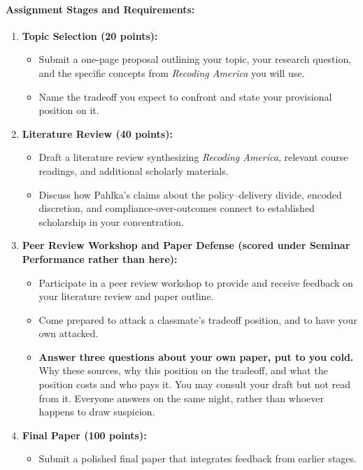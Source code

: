 \documentclass[11pt]{article}     %
\begin{document}
\paragraph*{Assignment Stages and Requirements:}
\begin{enumerate}
    \item \textbf{Topic Selection (20 points):}
    \begin{itemize}
        \item Submit a one-page proposal outlining your topic, your research question, and the specific concepts from \textit{Recoding America} you will use.
        \item Name the tradeoff you expect to confront and state your provisional position on it.
    \end{itemize}
    \item \textbf{Literature Review (40 points):}
    \begin{itemize}
        \item Draft a literature review synthesizing \textit{Recoding America}, relevant course readings, and additional scholarly materials.
        \item Discuss how Pahlka's claims about the policy--delivery divide, encoded discretion, and compliance-over-outcomes connect to established scholarship in your concentration.
    \end{itemize}
    \item \textbf{Peer Review Workshop and Paper Defense (scored under Seminar Performance rather than here):}
    \begin{itemize}
        \item Participate in a peer review workshop to provide and receive feedback on your literature review and paper outline.
        \item Come prepared to attack a classmate's tradeoff position, and to have your own attacked.
        \item \textbf{Answer three questions about your own paper, put to you cold.} Why these sources, why this position on the tradeoff, and what the position costs and who pays it. You may consult your draft but not read from it. Everyone answers on the same night, rather than whoever happens to draw suspicion.
    \end{itemize}
    \item \textbf{Final Paper (100 points):}
    \begin{itemize}
        \item Submit a polished final paper that integrates feedback from earlier stages.

\end{itemize}
\end{enumerate}
\end{document}

